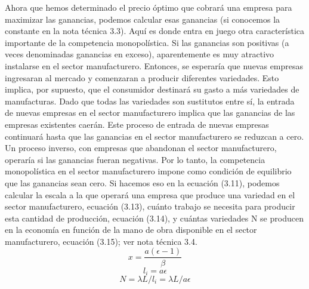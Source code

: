 Ahora que hemos determinado el precio óptimo que cobrará una empresa para maximizar las ganancias, podemos calcular esas ganancias (si conocemos la constante en la nota técnica 3.3). Aquí es donde entra en juego otra característica importante de la competencia monopolística. Si las ganancias son positivas (a veces denominadas ganancias en exceso), aparentemente es muy atractivo instalarse en el sector manufacturero. Entonces, se esperaría que nuevas empresas ingresaran al mercado y comenzaran a producir diferentes variedades. Esto implica, por supuesto, que el consumidor destinará su gasto a más variedades de manufacturas. Dado que todas las variedades son sustitutos entre sí, la entrada de nuevas empresas en el sector manufacturero implica que las ganancias de las empresas existentes caerán. Este proceso de entrada de nuevas empresas continuará hasta que las ganancias en el sector manufacturero se reduzcan a cero. Un proceso inverso, con empresas que abandonan el sector manufacturero, operaría si las ganancias fueran negativas. Por lo tanto, la competencia monopolística en el sector manufacturero impone como condición de equilibrio que las ganancias sean cero. Si hacemos eso en la ecuación (3.11), podemos calcular la escala a la que operará una empresa que produce una variedad en el sector manufacturero, ecuación (3.13), cuánto trabajo se necesita para producir esta cantidad de producción, ecuación (3.14), y cuántas variedades N se producen en la economía en función de la mano de obra disponible en el sector manufacturero, ecuación (3.15); ver nota técnica 3.4.
$$x=\dfrac{a(\epsilon-1)}{\beta}$$
$$l_i=a\epsilon$$
$$N=\lambda L/l_i = \lambda L/a\epsilon$$

